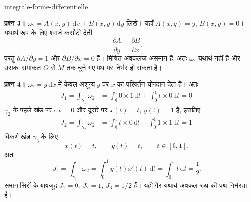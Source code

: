 \begin{exo}{integrale-forme-differentielle}
\begin{solution}
\textbf{प्रश्न 3।} $\omega_2=A(x,y)\,\mathrm{d}x+B(x,y)\,\mathrm{d}y$ लिखें। यहाँ
$A(x,y)=y$, $B(x,y)=0$। यथार्थ रूप के लिए श्वार्ज कसौटी देती
\[
\frac{\partial A}{\partial y}=\frac{\partial B}{\partial x}.
\]
परंतु $\partial A/\partial y=1$ और $\partial B/\partial x=0$ हैं। मिश्रित अवकलज असमान हैं,
अतः $\omega_2$ यथार्थ नहीं है और उसका समाकल $O$ से $M$ तक चुने गए पथ पर निर्भर हो सकता है।

\textbf{प्रश्न 4।} $\omega_2=y\,\mathrm{d}x$ में केवल अशून्य $y$ पर $x$ का परिवर्तन योगदान देता है। अतः
\[
\begin{aligned}
J_1=\int_{\gamma_1}\omega_2
&=\int_0^1 0\times1\,\mathrm{d}t+\int_0^1 t\times0\,\mathrm{d}t=0.
\end{aligned}
\]
$\gamma_2$ के पहले खंड पर $\mathrm{d}x=0$ और दूसरे पर $x(t)=t$, $y(t)=1$ है, इसलिए
\[
\begin{aligned}
J_2=\int_{\gamma_2}\omega_2
&=\int_0^1 t\times0\,\mathrm{d}t+\int_0^1 1\times1\,\mathrm{d}t=1.
\end{aligned}
\]
विकर्ण खंड $\gamma_3$ के लिए
\[
x(t)=t,\qquad y(t)=t,\qquad t\in[0,1],
\]
अतः
\[
J_3=\int_{\gamma_3}\omega_2
=\int_0^1y(t)x'(t)\,\mathrm{d}t
=\int_0^1t\,\mathrm{d}t=\frac12.
\]
समान सिरों के बावजूद $J_1=0$, $J_2=1$, $J_3=1/2$ हैं। यही गैर-यथार्थ अवकल रूप की पथ-निर्भरता है।
\end{solution}
\end{exo}

